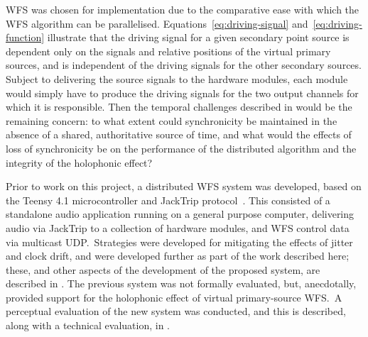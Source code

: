 WFS was chosen for implementation due to the comparative ease with which the WFS
algorithm can be parallelised.
Equations~\eqref{eq:driving-signal} and~\eqref{eq:driving-function} illustrate
that the driving signal for a given secondary point source is dependent only
on the signals and relative positions of the virtual primary sources, and is
independent of the driving signals for the other secondary sources.
Subject to delivering the source signals to the hardware modules, each module
would simply have to produce the driving signals for the two output channels
for which it is responsible.
Then the temporal challenges described in  would
be the remaining concern: to what extent could synchronicity be maintained
in the absence of a shared, authoritative source of time, and what would the
effects of loss of synchronicity be on the performance of the distributed
algorithm and the integrity of the holophonic effect?

Prior to work on this project, a distributed WFS system was developed, based on
the Teensy 4.1 microcontroller and JackTrip
protocol~\citep{rushton_microcontroller-based_2023}.
This consisted of a standalone audio application running on a general purpose
computer, delivering audio via JackTrip to a collection of hardware modules,
and WFS control data via multicast UDP.\
Strategies were developed for mitigating the effects of jitter and clock drift,
and were developed further as part of the work described here;
these, and other aspects of the development of the proposed system, are
described in \secref{sec:method}.
The previous system was not formally evaluated, but, anecdotally, provided
support for the holophonic effect of virtual primary-source WFS.\
A perceptual evaluation of the new system was conducted, and this is described,
along with a technical evaluation, in \secref{sec:results}.
